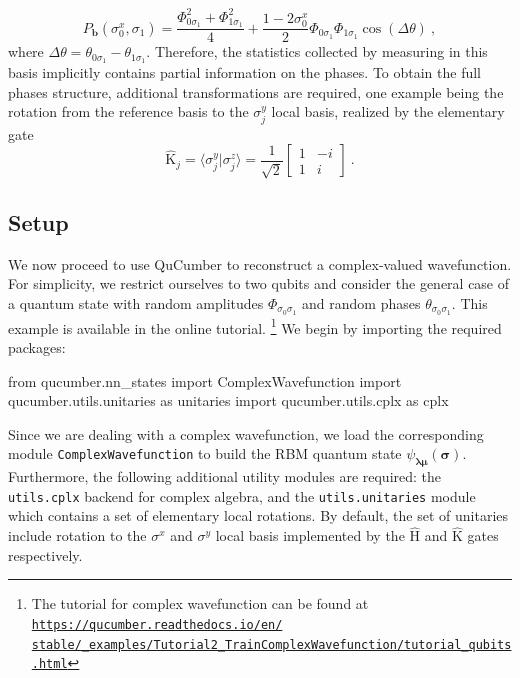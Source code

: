\documentclass[submission, Phys, hidelnks]{SciPost}
\begin{document}
\begin{equation}
    P_{\bm{b}}(\sigma_0^x,\sigma_1)=\frac{\Phi_{0\sigma_1}^2+\Phi_{1\sigma_1}^2}{4}+\frac{1-2\sigma_0^x}{2}\Phi_{0\sigma_1}\Phi_{1\sigma_1}\cos(\Delta\theta)\:,
\end{equation}
where $\Delta\theta=\theta_{0\sigma_1}-\theta_{1\sigma_1}$. Therefore, the statistics collected by measuring in this basis implicitly contains partial information on the phases. To obtain the full phases structure, additional transformations are required, one example being the rotation from the reference basis to the $\sigma^y_j$ local basis, realized by
the elementary gate
\begin{equation}
        \hat{\mathrm{K}}_j=\langle\sigma_j^y|\sigma_j^z\rangle=\frac{1}{\sqrt{2}}\begin{bmatrix}1 & -i\\
    1 & i
\end{bmatrix}\:.
\end{equation}


\subsection{Setup}
We now proceed to use QuCumber to reconstruct a complex-valued wavefunction. For simplicity, we restrict ourselves to two qubits and consider the general case of a quantum state with random amplitudes $\Phi_{\sigma_0\sigma_1}$ and random phases $\theta_{\sigma_0\sigma_1}$. This example is available in the online tutorial.
\footnote{The tutorial for complex wavefunction can be found at
    \href{https://qucumber.readthedocs.io/en/stable/\_examples/Tutorial2_TrainComplexWavefunction/tutorial_qubits.html
    }{\texttt{https://qucumber.readthedocs.io/en/\\stable/\_examples/Tutorial2\_TrainComplexWavefunction/tutorial\_qubits.html}}
}
We begin by importing the required packages:

\begin{python}
from qucumber.nn_states import ComplexWavefunction
import qucumber.utils.unitaries as unitaries
import qucumber.utils.cplx as cplx
\end{python}
Since we are dealing with a complex wavefunction, we load the corresponding module 
\verb|ComplexWavefunction| to build the RBM quantum state $\psi_{\bm{\lambda\mu}}(\bm{\sigma})$. Furthermore, the following additional utility modules are required: the \verb|utils.cplx| backend for complex algebra, and the \verb|utils.unitaries| module  which contains a set of elementary local rotations. By default, the set of unitaries include rotation to the $\sigma^x$ and $\sigma^y$ local basis implemented by the $\hat{\mathrm{H}}$ and $\hat{\mathrm{K}}$ gates respectively.
\end{document}
